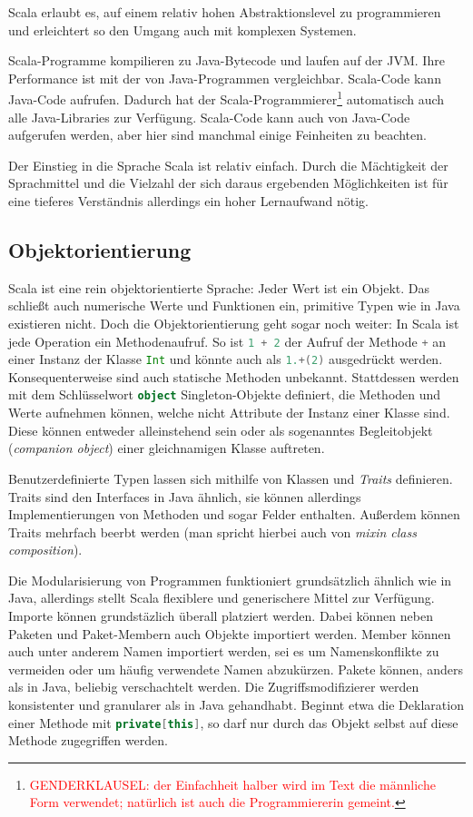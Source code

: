 \documentclass[a4paper, 12pt, hidelinks, listof=totoc, listoftables=totoc, bibliography=totoc]{scrreprt}
\newcommand{\scala}[1]{\lstinline[language=Scala, style=inline]|#1|}
\newcommand{\TODO}[1]{\textcolor{red}{#1}\newline}
\begin{document}
Scala erlaubt es, auf einem relativ hohen Abstraktionslevel zu programmieren und erleichtert so den Umgang auch mit komplexen Systemen.

Scala-Programme kompilieren zu Java-Bytecode und laufen auf der \ac{JVM}. Ihre Performance ist mit der von Java-Programmen vergleichbar. Scala-Code kann Java-Code aufrufen. Dadurch hat der Scala-Programmierer\footnote{\TODO{GENDERKLAUSEL: der Einfachheit halber wird im Text die männliche Form verwendet; natürlich ist auch die Programmiererin gemeint.}} automatisch auch alle Java-Libraries zur Verfügung. Scala-Code kann auch von Java-Code aufgerufen werden, aber hier sind manchmal einige Feinheiten zu beachten.\cite[S. 13 ff.]{odersky2008.PIS}

Der Einstieg in die Sprache Scala ist relativ einfach. Durch die Mächtigkeit der Sprachmittel und die Vielzahl der sich daraus ergebenden Möglichkeiten ist für eine tieferes Verständnis allerdings ein hoher Lernaufwand nötig.



\subsection{Objektorientierung}

Scala ist eine rein objektorientierte Sprache: Jeder Wert ist ein Objekt. Das schließt auch numerische Werte und Funktionen ein, primitive Typen wie in Java existieren nicht. Doch die Objektorientierung geht sogar noch weiter: In Scala ist jede Operation ein Methodenaufruf. So ist \scala{1 + 2} der Aufruf der Methode \scala{+} an einer Instanz der Klasse \scala{Int} und könnte auch als \scala{1.+(2)} ausgedrückt werden. Konsequenterweise sind auch statische Methoden unbekannt. Stattdessen werden mit dem Schlüsselwort \scala{object} Singleton-Objekte definiert, die Methoden und Werte aufnehmen können, welche nicht Attribute der Instanz einer Klasse sind. Diese können entweder alleinstehend sein oder als sogenanntes Begleitobjekt (\textit{companion object}) einer gleichnamigen Klasse auftreten.

Benutzerdefinierte Typen lassen sich mithilfe von Klassen und \textit{Traits} definieren. Traits sind den Interfaces in Java ähnlich, sie können allerdings Implementierungen von Methoden und sogar Felder enthalten. Außerdem können Traits mehrfach beerbt werden (man spricht hierbei auch von \textit{mixin class composition}).

Die Modularisierung von Programmen funktioniert grundsätzlich ähnlich wie in Java, allerdings stellt Scala flexiblere und generischere Mittel zur Verfügung. Importe können grundstäzlich überall platziert werden. Dabei können neben Paketen und Paket-Membern auch Objekte importiert werden. Member können auch unter anderem Namen importiert werden, sei es um Namenskonflikte zu vermeiden oder um häufig verwendete Namen abzukürzen.
Pakete können, anders als in Java, beliebig verschachtelt werden. Die Zugriffsmodifizierer werden konsistenter und granularer als in Java gehandhabt. Beginnt etwa die Deklaration einer Methode mit \scala{private[this]}, so darf nur durch das Objekt selbst auf diese Methode zugegriffen werden.\cite[S. 9 f., S. 233 ff.]{odersky2008.PIS}\cite{scala-lang.ATS}
\end{document}
